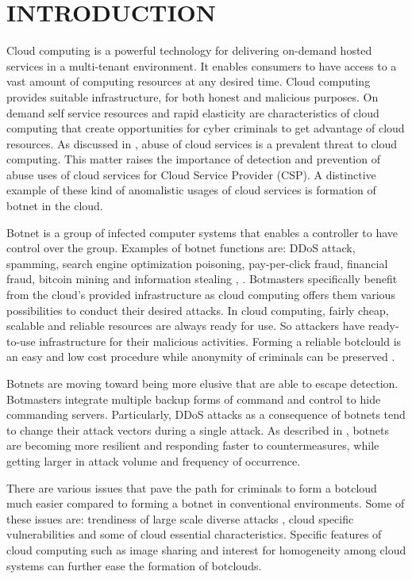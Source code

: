 \documentclass[conference]{IEEEtran}
\begin{document}
\section{INTRODUCTION}
Cloud computing is a powerful technology for delivering on-demand hosted services in a multi-tenant environment. It enables consumers to have access to a vast amount of computing resources at any desired time. Cloud computing provides suitable infrastructure, for both honest and malicious purposes. On demand self service resources and rapid elasticity are characteristics of cloud computing that create opportunities for cyber criminals to get advantage of cloud resources. As discussed in \cite{ref1}, abuse of cloud services is a prevalent threat to cloud computing. This matter raises the importance of detection and prevention of abuse uses of cloud services for Cloud Service Provider (CSP). A distinctive example of these kind of anomalistic usages of cloud services is formation of botnet in the cloud.

Botnet is a group of infected computer systems that enables a controller to have control over the group. Examples of botnet functions are: DDoS attack, spamming, search engine optimization poisoning, pay-per-click fraud, financial fraud, bitcoin mining and information stealing \cite{ref22}, \cite{ref34}. Botmasters specifically benefit from the cloud's provided infrastructure as cloud computing offers them various possibilities to conduct their desired attacks. In cloud computing, fairly cheap, scalable and reliable resources are always ready for use. So attackers have ready-to-use infrastructure for their malicious activities. Forming a reliable botclould is an easy and low cost procedure while anonymity of criminals can be preserved \cite{ref42}. 

Botnets are moving toward being more elusive that are able to escape detection. Botmasters integrate multiple backup forms of command and control to hide commanding servers. Particularly, DDoS attacks as a consequence of botnets tend to change their attack vectors during a single attack. As described in \cite{ref14}, botnets are becoming more resilient and responding faster to countermeasures, while getting larger in attack volume and frequency of occurrence\cite{ref16}. 

There are various issues that pave the path for criminals to form a botcloud much easier compared to forming a botnet in conventional environments. Some of these issues are: trendiness of large scale diverse attacks \cite{ref36}, cloud specific vulnerabilities \cite{ref9} and some of cloud essential characteristics. Specific features of cloud computing such as image sharing and interest for homogeneity among cloud systems can further ease the formation of botclouds.    
\end{document}
